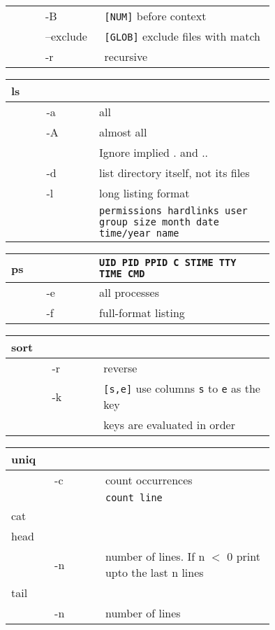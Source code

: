 \documentclass[a4]{article}
\begin{document}
\begin{multicols*}{3}
\begin{tabular}{>{\ttfamily}p{0.1\linewidth}>{\ttfamily}p{0.15\linewidth}p{0.5\linewidth}}
			& -B & \texttt{[NUM]} before context\\
			& --exclude & \texttt{[GLOB]} exclude files with match\\
			& -r & recursive\\
	\end{tabular}
	\begin{tabular}{>{\ttfamily}p{0.1\linewidth}>{\ttfamily}p{0.15\linewidth}p{0.5\linewidth}}
			ls & & \\\hline
			& -a & all\\
			& -A & almost all\\
			&    & Ignore implied . and ..\\
			& -d & list directory itself, not its files\\
			& -l & long listing format\\
			& & \texttt{permissions hardlinks user group size month date time/year name}\\
	\end{tabular}
	\begin{tabular}{>{\ttfamily}p{0.1\linewidth}>{\ttfamily}p{0.15\linewidth}p{0.5\linewidth}}
			ps & & \texttt{UID PID PPID C STIME TTY TIME CMD} \\\hline
			   & -e & all processes\\
			   & -f & full-format listing\\
	\end{tabular}
	\begin{tabular}{>{\ttfamily}p{0.1\linewidth}>{\ttfamily}p{0.15\linewidth}p{0.5\linewidth}}
			sort & &\\\hline
				 & -r & reverse\\
				 & -k & \texttt{[s,e]} use columns \texttt{s} to \texttt{e} as the key\\
				 & & keys are evaluated in order\\
	\end{tabular}
	\begin{tabular}{>{\ttfamily}p{0.1\linewidth}>{\ttfamily}p{0.15\linewidth}p{0.5\linewidth}}
			uniq & & \\\hline
			& -c & count occurrences\\
			& & \texttt{count line}\\
			cat & & \\\hline
			head & & \\\hline
				 & -n & number of lines. If n $ < $  0 print upto the last n lines\\
			tail & & \\\hline
				 & -n & number of lines\\

\end{tabular}
\end{multicols*}
\end{document}
